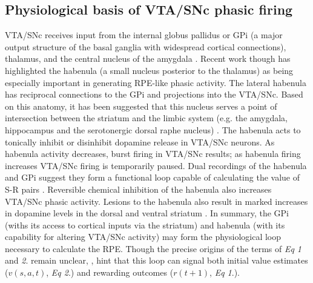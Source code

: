 \documentclass[doc]{apa}        %
\begin{document}
\subsection{Physiological basis of VTA/SNc phasic firing} %
\label{sub:physiological_basis_of_vta_snc_phasic_firing}
VTA/SNc receives input from the internal globus pallidus or GPi (a major output structure of the basal ganglia with widespread cortical connections), thalamus, and the central nucleus of the amygdala \cite{Botvinick:2008p6594}.  Recent work though has highlighted the habenula (a small nucleus posterior to the thalamus) as being especially important in generating RPE-like phasic activity.  The lateral habenula has reciprocal connections to the GPi and projections into the VTA/SNc. Based on this anatomy, it has been suggested that this nucleus serves a point of intersection between the striatum and the limbic system (e.g. the amygdala, hippocampus and the serotonergic dorsal raphe nucleus) \cite{Hikosaka:2008p4455}.  The habenula acts to tonically inhibit or disinhibit dopamine release in VTA/SNc neurons.  As habenula activity decreases, burst firing in VTA/SNc results; as habenula firing increases VTA/SNc firing is temporarily paused.  Dual recordings of the habenula and GPi suggest they form a functional loop capable of calculating the value of S-R pairs \cite{BrombergMartin:2010p7221}.  Reversible chemical inhibition of the habenula also increases VTA/SNc phasic activity.  Lesions to the habenula also result in marked increases in dopamine levels in the dorsal and ventral striatum \cite{BrombergMartin:2010p7221}.  In summary, the GPi (withs its access to cortical inputs via the striatum) and habenula (with its capability for altering VTA/SNc activity) may form the physiological loop necessary to calculate the RPE. Though the precise origins of the terms of \emph{Eq 1} and \emph{2}. remain unclear, , hint that this loop can signal both initial value estimates ($v(s,a,t)$, \emph{Eq 2}.) and rewarding outcomes ($r(t+1)$, \emph{Eq 1}.).
\end{document}
